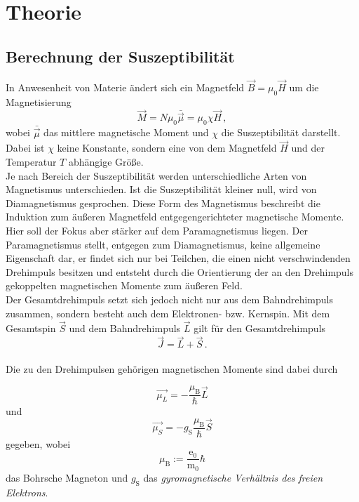 \section{Theorie}
\label{sec:theorie}

\subsection{Berechnung der Suszeptibilität}

In Anwesenheit von Materie ändert sich ein Magnetfeld $\vec{B} = \mu_0 \vec{H}$ um die Magnetisierung
\begin{equation*}
    \vec{M} = N \mu_0 \bar{\vec{\mu}} = \mu_0 \chi \vec{H} \,,
\end{equation*}
wobei $\bar{\vec{\mu}}$ das mittlere magnetische Moment und $\chi$ die Suszeptibilität darstellt.
Dabei ist $\chi$ keine Konstante, sondern eine von dem Magnetfeld $\vec{H}$ und der Temperatur $T$ abhängige Größe. \\

Je nach Bereich der Suszeptibilität werden unterschiedliche Arten von Magnetismus unterschieden.
Ist die Suszeptibilität kleiner null, wird von Diamagnetismus gesprochen.
Diese Form des Magnetismus beschreibt die Induktion zum äußeren Magnetfeld entgegengerichteter magnetische Momente. \\

Hier soll der Fokus aber stärker auf dem Paramagnetismus liegen.
Der Paramagnetismus stellt, entgegen zum Diamagnetismus, keine allgemeine Eigenschaft dar, er findet sich nur bei
Teilchen, die einen nicht verschwindenden Drehimpuls besitzen und entsteht durch die Orientierung der an den
Drehimpuls gekoppelten magnetischen Momente zum äußeren Feld. \\

Der Gesamtdrehimpuls setzt sich jedoch nicht nur aus dem Bahndrehimpuls zusammen, sondern besteht auch dem
Elektronen- bzw. Kernspin.
Mit dem Gesamtspin $\vec{S}$ und dem Bahndrehimpuls $\vec{L}$ gilt für den Gesamtdrehimpuls
\begin{equation*}
    \vec{J} = \vec{L} + \vec{S} \,.
\end{equation*} \\

Die zu den Drehimpulsen gehörigen magnetischen Momente sind dabei durch

\begin{equation*}
    \vec{\mu_L} = -\dfrac{\mu_\text{B}}{\hbar} \vec{L}
    \label{eq:magmomL}
\end{equation*}
und
\begin{equation*}
    \vec{\mu_S} = - g_\text{S} \dfrac{\mu_\text{B}}{\hbar} \vec{S}
\end{equation*}
gegeben, wobei
\begin{equation*}
    \mu_\text{B} := \frac{\text{e}_0}{\text{m}_0} \hbar
\end{equation*}
das Bohrsche Magneton und $g_\text{S}$ das \textit{gyromagnetische Verhältnis des freien Elektrons}. \\

